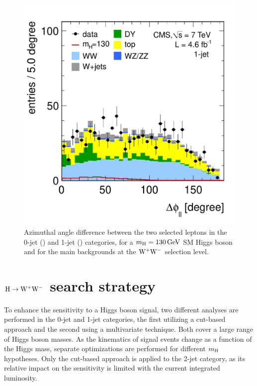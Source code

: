 \documentclass[12pt,twoside,a4paper,cmspaper,final,collab]{cms-tdr}
\begin{document}
\begin{figure}[htbp]
\begin{center}
  \includegraphics[width=\cmsFigWidth]{ww_1j_deltaphill}
	 \caption{Azimuthal angle difference between the two selected leptons
	 in the 0-jet (\cmsLeft) and 1-jet (\cmsRight) categories,
       for a $m_{\mathrm{H}}= 130\,\text{Ge\hspace{-.08em}V}$ SM Higgs boson and for the main
       backgrounds at the $\mathrm{W^+}{}\mathrm{W^-}$ selection level.}  \label{fig:deltaphi}
\end{center}
\end{figure}

\section{\texorpdfstring{$\mathrm{H} \to \mathrm{W^+}{}\mathrm{W^-}$}{Higgs to WW} search strategy}
\label{sec:hww}

To enhance the sensitivity to a Higgs boson signal, two different analyses are
performed in the 0-jet and 1-jet categories, the first utilizing
a cut-based approach and the second using a multivariate
technique. Both cover a large range of Higgs boson masses.
As the kinematics of signal events change as a function of the Higgs mass,
separate optimizations are performed for different $m_{\mathrm{H}}$ hypotheses.
Only the cut-based approach is applied to the 2-jet category,
as its relative impact on the sensitivity is limited with the current integrated luminosity.
\end{document}
